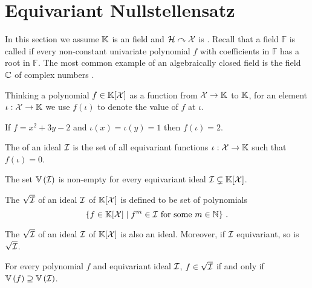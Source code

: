 %
\section{Equivariant Nullstellensatz}
%
In this section we assume $\mathbb{K}$ is an  field and $\mathcal{H}\curvearrowright\mathcal{X}$ is .
Recall that a field $\mathbb{F}$ is called  if every non-constant univariate polynomial $f$ with coefficients in $\mathbb{F}$ has a root in $\mathbb{F}$.
The most common example of an algebraically closed field is the field $\mathbb{C}$ of complex numbers
\cite[Section 1.1, Theorem 7]{CLO15}.

Thinking a polynomial $f\in\mathbb{K}[\mathcal{X}]$ as a function from $\mathcal{X} \to \mathbb{K}$ to $\mathbb{K}$,
for an element $\iota : \mathcal{X} \to \mathbb{K}$ we use $f(\iota)$ to denote the value of $f$ at $\iota$.
%
\begin{example}\label{ex:inst}
    If $f = x^2 + 3y - 2$ and $\iota(x) = \iota(y) = 1$ then $f(\iota) = 2$.
\end{example}
%
\begin{definition}\label{def:variety}
    The  of an ideal $\idl[I]$ is the set of all equivariant functions $\iota : \mathcal{X} \to \mathbb{K}$ such that $f(\iota) = 0$.
\end{definition}
%
\begin{theorem}\label{thm:weak null}
    The set $\zeros{\idl}$ is non-empty for every equivariant ideal $\idl \subsetneq \poly{\K}{\X}$.
\end{theorem}
%
\begin{definition}\label{def:rad}
    The  $\rad{\idl[I]}$ of an ideal $\idl[I]$ of $\mathbb{K}[\mathcal{X}]$ is defined to be set of polynomials
    \[
    \setof{f\in\poly{\K}{\Indets}}{f^m\in\idl[I] \text{ for some $m\in\N$}} \ .
    \]
\end{definition}
%
\begin{lemma}\label{lem:rad is ideal}
    The  $\rad{\idl[I]}$ of an ideal $\idl[I]$ of $\mathbb{K}[\mathcal{X}]$ is also an ideal.
    Moreover, if $\idl[I]$ equivariant,
    so is $\rad{\idl[I]}$.
\end{lemma}
%
\begin{theorem}\label{thm:strong null}
    For every polynomial $f$ and equivariant ideal $\idl[I]$,
    $f\in\rad{\idl[I]}$ if and only if $\zeros{f} \supseteq \zeros{\idl[I]}$.
\end{theorem}
